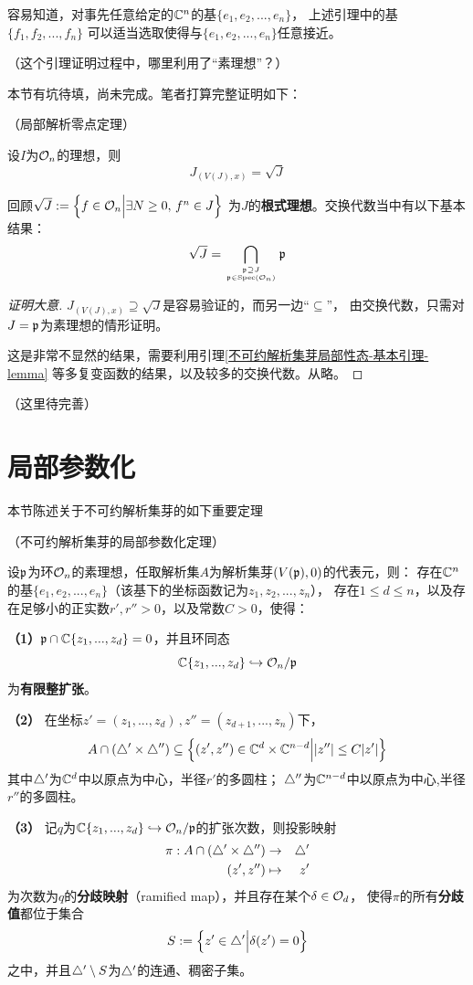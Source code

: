 \begin{rem}容易知道，对事先任意给定的$\mathbb{C}^n$的基$\{e_1,e_2,...,e_n\}$，
上述引理中的基$\{f_1,f_2,...,f_n\}$
可以适当选取使得与$\{e_1,e_2,...,e_n\}$任意接近。
\end{rem}

{\color{red}
（这个引理证明过程中，哪里利用了“素理想”？）
}

{\color{blue}
本节有坑待填，尚未完成。笔者打算完整证明如下：
}

\begin{thm}（局部解析零点定理）

设$I$为$\mathcal{O}_n$的理想，则
$$J_{(V(J),x)}=\sqrt{J}$$
\end{thm}

回顾$\sqrt{J}:=\Big\{ f\in\mathcal{O}_n \Big| \exists N\geq 0,\,f^n\in J \Big\}$
为$J$的\textbf{根式理想}。交换代数当中有以下基本结果：
$$\sqrt{J}=
\bigcap_{\mathfrak{p}\supseteq J\atop \mathfrak{p}\in\operatorname{Spec}(\mathcal{O}_n)}\mathfrak{p}$$

\begin{proof}[证明大意]
$J_{(V(J),x)}\supseteq\sqrt{J}$是容易验证的，而另一边“$\subseteq$”，
由交换代数，只需对$J=\mathfrak{p}$为素理想的情形证明。

这是非常不显然的结果，需要利用引理\ref{不可约解析集芽局部性态-基本引理-lemma}
等多复变函数的结果，以及较多的交换代数。从略。
\end{proof}
{
  \color{blue}
  （这里待完善）
}

\section{局部参数化}

本节陈述关于不可约解析集芽的如下重要定理

\begin{thm}（不可约解析集芽的局部参数化定理）

设$\mathfrak{p}$为环$\mathcal{O}_n$的素理想，任取解析集$A$为解析集芽$(V(\mathfrak{p}),0)$的代表元，则：
存在$\mathbb{C}^{n}$的基$\{e_1,e_2,...,e_n\}$（该基下的坐标函数记为$z_1,z_2,...,z_n$），
存在$1\leq d\leq n$，以及存在足够小的正实数$r',r''>0$，以及常数$C>0$，使得：

\textbf{（1）}$\mathfrak{p}\cap\mathbb{C}\{z_1,...,z_d\}=0$，并且环同态
$$\mathbb{C}\{z_1,...,z_d\}\hookrightarrow\mathcal{O}_n/\mathfrak{p}$$
为\textbf{有限整扩张}。\vs 

\textbf{（2）}
在坐标$z'=(z_1,...,z_d)\,,z''=(z_{d+1},...,z_n)$下，
$$A\cap(\triangle'\times\triangle'')\subseteq
\Big\{(z',z'')\in\mathbb{C}^d\times\mathbb{C}^{n-d}\Big||z''|\leq C|z'|\Big\}$$
其中$\triangle'$为$\mathbb{C}^d$中以原点为中心，半径$r'$的多圆柱；
$\triangle''$为$\mathbb{C}^{n-d}$中以原点为中心,半径$r''$的多圆柱。\vs 

\textbf{（3）}
记$q$为$\mathbb{C}\{z_1,...,z_d\}\hookrightarrow\mathcal{O}_n/\mathfrak{p}$的扩张次数，则投影映射
\begin{eqnarray*}
  \pi: A\cap(\triangle'\times\triangle'')&\to&\triangle'\\
  (z',z'')&\mapsto& z'
\end{eqnarray*}
为次数为$q$的\textbf{分歧映射}（ramified map），并且存在某个$\delta\in\mathcal{O}_d$，
使得$\pi$的所有\textbf{分歧值}都位于集合
$$S:=\Big\{ z'\in\triangle' \Big| \delta(z')=0 \Big\}$$
之中，并且$\triangle'\setminus S$为$\triangle'$的连通、稠密子集。
\label{解析集参数化-thm}
\end{thm}

